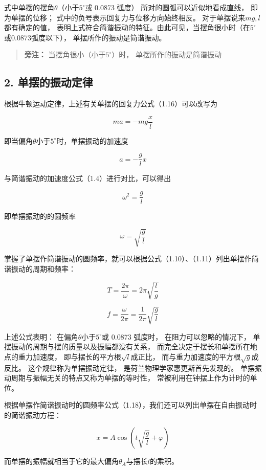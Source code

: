 式中单摆的摆角\(\theta\)（小于\(5^{\circ}\)或 0.0873 弧度）
所对的圆弧可以近似地看成直线， 即为单摆的位移；
式中的负号表示回复力与位移方向始终相反。
对于单摆说来\(mg, l\)都有确定的值，
表明上式符合简谐振动的特征。由此可见，当摆角很小时（在\(5^{\circ}\)或0.0873弧度以下），
单摆所作的振动是简谐振动。

\begin{quote}
\textbf{旁注：} 当摆角很小（小于\(5^{\circ}\)）时，
单摆所作的振动是简谐振动
\end{quote}

\subsection{2.
单摆的振动定律}\label{ux5355ux6446ux7684ux632fux52a8ux5b9aux5f8b}

根据牛顿运动定律，上述有关单摆的回复力公式（1.16）可以改写为

\[
ma=-mg\frac{x}{l}
\]

即当偏角\(\theta\)小于\(5^{\circ}\)时，单摆振动的加速度

\[
a = - \frac {g}{l} x \tag {1.17}
\]

与简谐振动的加速度公式（1.4）进行对比，可以得出

\[
\omega^ {2} = \frac {g}{l}
\]

即单摆振动的的圆频率

\[
\omega = \sqrt {\frac {g}{l}} \tag {1.18}
\]

掌握了单摆作简谐振动的圆频率，就可以根据公式（1.10）、（1.11）列出单摆作简谐振动的周期和频率：

\[
T = \frac {2 \pi}{\omega} = 2 \pi \sqrt {\frac {l}{g}} \tag {1.19}
\]

\[
f = \frac {\omega}{2 \pi} = \frac {1}{2 \pi} \sqrt {\frac {g}{l}} \tag {1.20}
\]

上述公式表明： 在偏角\(\theta\)小于\(5^{\circ}\)或 0.0873 弧度时，
在阻力可以忽略的情况下， 单摆振动的周期与摆的质量以及振幅都没有关系，
而完全决定于摆长和单摆所在地点的重力加速度，
即与摆长的平方根\(\sqrt{l}\)成正比，
而与重力加速度的平方根\(\sqrt{g}\)成反比。 这个规律称为单摆振动定律，
是荷兰物理学家惠更斯首先发现的。
单摆振动周期与振幅无关的特点又称为单摆的等时性，
常被利用在钟摆上作为计时的单位。

根据单摆作简谐振动时的圆频率公式（1.18），我们还可以列出单摆在自由振动时的简谐振动方程：

\[
x = A \cos \left(t \sqrt {\frac {g}{l}} + \varphi\right) \tag {1.21}
\]

而单摆的振幅就相当于它的最大偏角\(\theta_{A}\)与摆长\(l\)的乘积。

